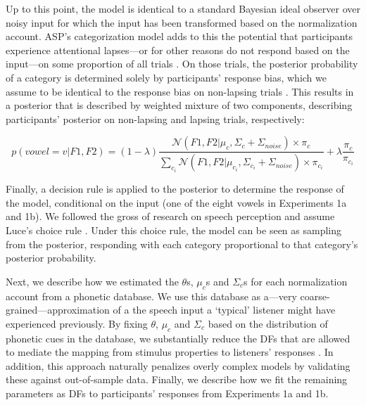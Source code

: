 \documentclass[preprint]{JASA}
\begin{document}
Up to this point, the model is identical to a standard Bayesian ideal observer over noisy input \citep{feldman2009, kronrod2016} for which the input has been transformed based on the normalization account. ASP's categorization model adds to this the potential that participants experience attentional lapses---or for other reasons do not respond based on the input---on some proportion of all trials \citep[\(\lambda\), as in standard psychometric lapsing models,][]{wichmann-hill2001}. On those trials, the posterior probability of a category is determined solely by participants' response bias, which we assume to be identical to the response bias on non-lapsing trials \citep[following][]{xie2023}. This results in a posterior that is described by weighted mixture of two components, describing participants' posterior on non-lapsing and lapsing trials, respectively:

\begin{equation}
 p(vowel = v|F1, F2) = (1-\lambda) \frac{\mathcal{N}(F1, F2| \mu_c, \Sigma_c + \Sigma_{noise}) \times \pi_c}{\sum_{c_i} \mathcal{N}(F1, F2|\mu_{c_i}, \Sigma_{c_i} + \Sigma_{noise}) \times \pi_{c_i}} + \lambda \frac{\pi_c}{\pi_{c_i}} \label{eq:Bayes-rule-ASP}
\end{equation}

Finally, a decision rule is applied to the posterior to determine the response of the model, conditional on the input (one of the eight vowels in Experiments 1a and 1b). We followed the gross of research on speech perception and assume Luce's choice rule \citetext{\citealp{luce1959}; \citealp[for discussion, see][]{massaro-friedman1990}}. Under this choice rule, the model can be seen as sampling from the posterior, responding with each category proportional to that category's posterior probability.

Next, we describe how we estimated the \(\theta\)s, \(\mu_c\)s and \(\Sigma_c\)s for each normalization account from a phonetic database. We use this database as a---very coarse-grained---approximation of a the speech input a `typical' listener might have experienced previously. By fixing \(\theta\), \(\mu_c\) and \(\Sigma_c\) based on the distribution of phonetic cues in the database, we substantially reduce the DFs that are allowed to mediate the mapping from stimulus properties to listeners' responses \citep[following][]{xie2023}. In addition, this approach naturally penalizes overly complex models by validating these against out-of-sample data. Finally, we describe how we fit the remaining parameters as DFs to participants' responses from Experiments 1a and 1b.
\end{document}
